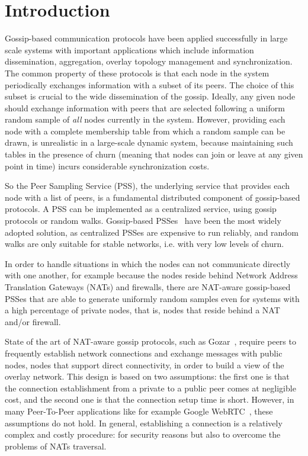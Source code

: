 
\chapter*{Introduction} %
\label{sommario}

Gossip-based communication protocols have been applied successfully in large scale systems with important applications which include information dissemination, aggregation, overlay topology management and synchronization. The common property of these protocols is that each node in the system periodically exchanges information with a subset of its peers. The choice of this subset is crucial to the wide dissemination of the gossip. Ideally, any given node should exchange information with peers that are selected following a uniform random sample of \textit{all} nodes currently in the system. However, providing each node with a complete membership table from which a random sample can be drawn, is unrealistic in a large-scale dynamic system, because maintaining such tables in the presence of churn (meaning that nodes can join or leave at any given point in time) incurs considerable synchronization costs. 

So the Peer Sampling Service (PSS), the underlying service that provides each node with a list of peers, is a fundamental distributed component of gossip-based protocols. A PSS can be implemented as a centralized service, using gossip protocols or random walks. Gossip-based PSSes~\cite{gossip_protocol} have been the most widely adopted solution, as centralized PSSes are expensive to run reliably, and random walks are only suitable for stable networks, i.e. with very low levels of churn. 

In order to handle situations in which the nodes can not communicate directly with one another, for example because the nodes reside behind Network Address Translation Gateways (NATs) and firewalls, there are NAT-aware gossip-based PSSes that are able to generate uniformly random samples even for systems with a high percentage of private nodes, that is, nodes that reside behind a NAT and/or firewall. 

State of the art of NAT-aware gossip protocols, such as Gozar~\cite{gozar}, require peers to frequently establish network connections and exchange messages with public nodes, nodes that support direct connectivity, in order to build a view of the overlay network. This design is based on two assumptions: the first one is that the connection establishment from a private to a public peer comes at negligible cost, and the second one is that the connection setup time is short. However, in many Peer-To-Peer applications like for example Google WebRTC~\cite{webrtc}, these assumptions do not hold. In general, establishing a connection is a relatively complex and costly procedure: for security reasons but also to overcome the problems of NATs traversal. 


